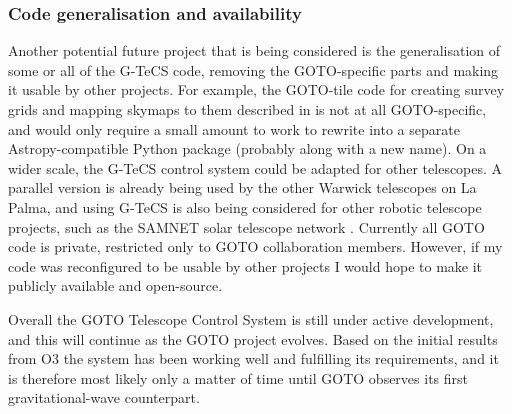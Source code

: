\begin{colsection}
\subsubsection{Code generalisation and availability}

Another potential future project that is being considered is the generalisation of some or all of the G-TeCS code, removing the GOTO-specific parts and making it usable by other projects. For example, the GOTO-tile code for creating survey grids and mapping skymaps to them described in  is not at all GOTO-specific, and would only require a small amount to work to rewrite into a separate Astropy-compatible Python package (probably along with a new name). On a wider scale, the G-TeCS control system could be adapted for other telescopes. A parallel version is already being used by the other Warwick telescopes on La Palma, and using G-TeCS is also being considered for other robotic telescope projects, such as the SAMNET solar telescope network \citep{SAMNET}. Currently all GOTO code is private, restricted only to GOTO collaboration members. However, if my code was reconfigured to be usable by other projects I would hope to make it publicly available and open-source.

\bigskip

Overall the GOTO Telescope Control System is still under active development, and this will continue as the GOTO project evolves. Based on the initial results from O3 the system has been working well and fulfilling its requirements, and it is therefore most likely only a matter of time until GOTO observes its first gravitational-wave counterpart.

\end{colsection}

